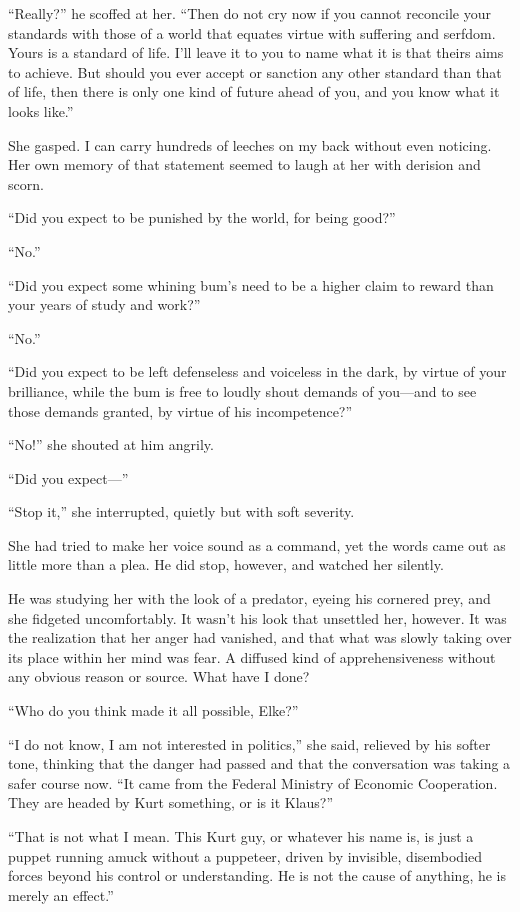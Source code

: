 ``Really?'' he scoffed at her. ``Then do not cry now if you cannot reconcile your standards with those of a world that equates virtue with suffering and serfdom. Yours is a standard of life. I'll leave it to you to name what it is that theirs aims to achieve. But should you ever accept or sanction any other standard than that of life, then there is only one kind of future ahead of you, and you know what it looks like.''

She gasped. I can carry hundreds of leeches on my back without even noticing. Her own memory of that statement seemed to laugh at her with derision and scorn.

``Did you expect to be punished by the world, for being good?''

``No.''

``Did you expect some whining bum's need to be a higher claim to reward than your years of study and work?''

``No.''

``Did you expect to be left defenseless and voiceless in the dark, by virtue of your brilliance, while the bum is free to loudly shout demands of you---and to see those demands granted, by virtue of his incompetence?''

``No!'' she shouted at him angrily.

``Did you expect---''

``Stop it,'' she interrupted, quietly but with soft severity.

She had tried to make her voice sound as a command, yet the words came out as little more than a plea. He did stop, however, and watched her silently.

He was studying her with the look of a predator, eyeing his cornered prey, and she fidgeted uncomfortably. It wasn't his look that unsettled her, however. It was the realization that her anger had vanished, and that what was slowly taking over its place within her mind was fear. A diffused kind of apprehensiveness without any obvious reason or source. What have I done?

``Who do you think made it all possible, Elke?''

``I do not know, I am not interested in politics,'' she said, relieved by his softer tone, thinking that the danger had passed and that the conversation was taking a safer course now. ``It came from the Federal Ministry of Economic Cooperation. They are headed by Kurt something, or is it Klaus?''

``That is not what I mean. This Kurt guy, or whatever his name is, is just a puppet running amuck without a puppeteer, driven by invisible, disembodied forces beyond his control or understanding. He is not the cause of anything, he is merely an effect.''

